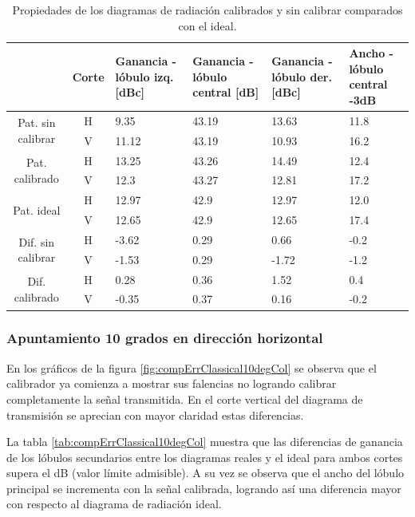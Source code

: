 \begin{table}[H]
  \footnotesize
  \centering
  \begin{tabular}{|c|c|p{2cm}|p{2.5cm}|p{2.5cm}|p{2.5cm}|}
    \cline{2-6}
    \multicolumn{1}{c|}{} & Corte & Ganancia - lóbulo izq. [dBc] & Ganancia - lóbulo central [dB] &
    Ganancia - lóbulo der. [dBc] & Ancho - lóbulo central -3dB \tabularnewline\hline
    \multirow{2}{2cm}{Pat. sin calibrar} & H & 9.35 & 43.19 & 13.63 & 11.8 \tabularnewline\cline{2-6}
     & V & 11.12 & 43.19 & 10.93 & 16.2 \tabularnewline\hline
    \multirow{2}{2cm}{Pat. calibrado} & H & 13.25 & 43.26 & 14.49 & 12.4 \tabularnewline\cline{2-6}
     & V & 12.3 & 43.27 & 12.81 & 17.2 \tabularnewline\hline
    \multirow{2}{2cm}{Pat. ideal} & H & 12.97 & 42.9 & 12.97 & 12.0 \tabularnewline\cline{2-6}
     & V & 12.65 & 42.9 & 12.65 & 17.4 \tabularnewline\hline
    \multirow{2}{2cm}{Dif. sin calibrar} & H & -3.62 & 0.29 & 0.66 & -0.2\tabularnewline\cline{2-6}
     & V & -1.53 & 0.29 & -1.72 & -1.2 \tabularnewline\hline
    \multirow{2}{2cm}{Dif. calibrado} & H & 0.28 & 0.36 & 1.52 & 0.4 \tabularnewline\cline{2-6}
     & V & -0.35 & 0.37 & 0.16 & -0.2 \tabularnewline\hline
  \end{tabular}
  \caption{Propiedades de los diagramas de radiación calibrados y sin calibrar comparados con el ideal.}
  \label{tab:compErrClassical0deg}
\end{table}


\subsubsection{Apuntamiento 10 grados en dirección horizontal}

En los gráficos de la figura \ref{fig:compErrClassical10degCol} se observa que el calibrador ya comienza a mostrar sus falencias no 
logrando calibrar completamente la señal transmitida. En el corte vertical del diagrama de transmisión se aprecian con mayor 
claridad estas diferencias.

La tabla \ref{tab:compErrClassical10degCol} muestra que las diferencias de ganancia de los lóbulos secundarios entre los diagramas 
reales y el ideal para ambos cortes supera el dB (valor límite admisible). A su vez se observa que el ancho del lóbulo 
principal se incrementa con la señal calibrada, logrando así una diferencia mayor con respecto al diagrama de radiación ideal.

